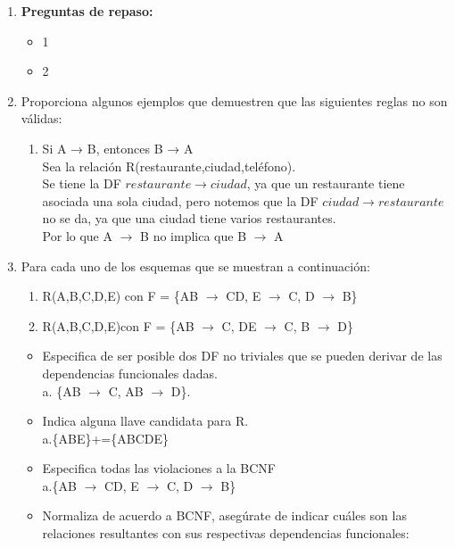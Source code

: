 \documentclass[a4paper, 12pt]{report}
\begin{document}
\begin{enumerate}
\item{
    \textbf{Preguntas de repaso:}
    \begin{itemize}
        \item 1
        \item 2
    \end{itemize}
}
\item {Proporciona algunos ejemplos que demuestren que las siguientes reglas 
	no son válidas:
\begin{enumerate}
	\item Si A → B, entonces B → A\\
	Sea la relación R(restaurante,ciudad,teléfono).\\
	Se tiene la DF $restaurante \rightarrow ciudad$, ya que un restaurante tiene 
	asociada una sola ciudad, pero notemos que la DF $ciudad \rightarrow 
	restaurante$ no se da, ya que una ciudad tiene varios restaurantes. \\
	Por lo que A $\rightarrow$ B no implica que B $\rightarrow$ A
\end{enumerate}}
\item {Para cada uno de los esquemas que se muestran a continuación:
\begin{enumerate}
	\item R(A,B,C,D,E) con F = \{AB $\rightarrow$ CD, E $\rightarrow$ C, D
		$\rightarrow$ B\}
	\item R(A,B,C,D,E)con F = \{AB $\rightarrow$ C, DE $\rightarrow$ C, B $\rightarrow$ D\}
\end{enumerate}
\begin{itemize}
	\item Especifica de  ser  posible dos DF  no  triviales que  se  pueden  
	derivar  de  las  dependencias funcionales dadas.\\
	a. \{AB $\rightarrow$ C, AB $\rightarrow$ D\}.\\
	\item Indica alguna llave candidata para R.\\
	a.\{ABE\}+=\{ABCDE\}\\
	\item Especifica todas las violaciones a la BCNF\\
	a.\{AB $\rightarrow$ CD, E $\rightarrow$ C, D
	$\rightarrow$ B\}
	\item Normaliza de acuerdo a BCNF, asegúrate de indicar cuáles son las 
	relaciones resultantes con sus respectivas dependencias funcionales:\\

\end{itemize}}
\end{enumerate}
\end{document}
